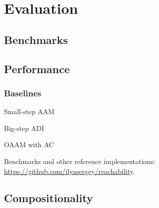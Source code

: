 \section{Evaluation}

\subsection{Benchmarks}

\subsection{Performance}

\subsubsection{Baselines}
Small-step AAM

Big-step ADI

OAAM with AC \cite{Boucher:1996:ACN:647473.727587, Johnson:2013:OAA:2500365.2500604}

Benchmarks and other reference implementations: \url{https://github.com/ilyasergey/reachability}.

\subsection{Compositionality}

